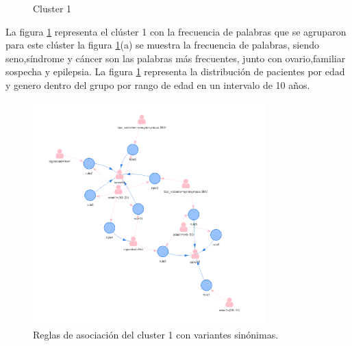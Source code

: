\begin{figure}[H]
	\centering
	\label{f:nube1}
	\caption{Cluster 1} \label{fig:cluster1}
\end{figure} 

La figura \ref{fig:cluster1} representa el clúster 1 con la frecuencia de palabras que se agruparon para este clúster  la figura \ref{fig:cluster1}(a) se muestra la frecuencia de palabras, siendo seno,síndrome y cáncer son las palabras más frecuentes, junto con ovario,familiar sospecha y epilepsia. La figura \ref{fig:cluster1} representa la distribución de pacientes por edad y genero dentro del grupo por rango de edad en un intervalo de 10 años.\\

\begin{figure}[H]
	\centering
	\includegraphics[width=0.8\textwidth]{Kap4/reglas1_1}
	\caption{Reglas de asociación del cluster 1 con variantes sinónimas.} \label{fig:reglas1}
\end{figure}

